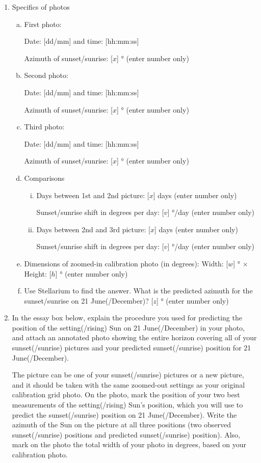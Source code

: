 \documentclass[12pt]{article}
\begin{document}
\begin{enumerate}
\item
Specifics of photos
\begin{enumerate}[a.]
    \item
    First photo:
    
    Date: [dd/mm] and time: [hh:mm:ss]
    
    Azimuth of sunset/sunrise: [$x$] \si{\degree} (enter number only)
    \item
    Second photo:
    
    Date: [dd/mm] and time: [hh:mm:ss]
    
    Azimuth of sunset/sunrise: [$x$] \si{\degree} (enter number only)
    \item
    Third photo:
    
    Date: [dd/mm] and time: [hh:mm:ss]
    
    Azimuth of sunset/sunrise: [$x$] \si{\degree} (enter number only)
    \item
    Comparisons
    \begin{enumerate}[i.]
        \item
        Days between 1st and 2nd picture: [$x$] days (enter number only)
        
        Sunset/sunrise shift in degrees per day: [$v$] \si{\degree}/day (enter number only)
        \item
        Days between 2nd and 3rd picture: [$x$] days (enter number only)
        
        Sunset/sunrise shift in degrees per day: [$v$] \si{\degree}/day (enter number only)
    \end{enumerate}
    \item
    Dimensions of zoomed-in calibration photo (in degrees): Width: [$w$] \si{\degree} $\times$ Height: [$h$] \si{\degree} (enter number only)
    \item
    Use Stellarium to find the answer. What is the predicted azimuth for the sunset/sunrise on 21 June(/December)? [$z$] \si{\degree} (enter number only)
\end{enumerate}
 
\item
In the essay box below, explain the procedure you used for predicting the position of the setting(/rising) Sun on 21 June(/December) in your photo, and attach an annotated photo showing the entire horizon covering all of your sunset(/sunrise) pictures and your predicted sunset(/sunrise) position for 21 June(/December).

The picture can be one of your sunset(/sunrise) pictures or a new picture, and it should be taken with the same zoomed-out settings as your original calibration grid photo. On the photo, mark the position of your two best measurements of the setting(/rising) Sun's position, which you will use to predict the sunset(/sunrise) position on 21 June(/December). Write the azimuth of the Sun on the picture at all three positions (two observed sunset(/sunrise) positions and predicted sunset(/sunrise) position). Also, mark on the photo the total width of your photo in degrees, based on your calibration photo.
\end{enumerate}
\end{document}
